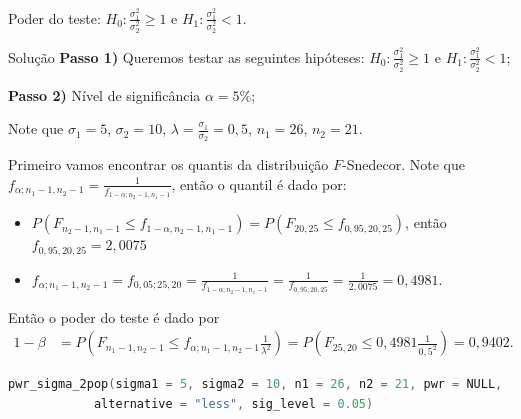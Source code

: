 \documentclass[9pt]{beamer}
\begin{document}
\begin{frame}[fragile]{Poder do teste: $H_0:\frac{\sigma_1^2}{\sigma_2^2} \geq 1$ e $H_1:\frac{\sigma_1^2}{\sigma_2^2} < 1$.}

\small
\begin{block}{Solução}
	\textbf{Passo 1)} Queremos testar as seguintes hipóteses: $H_0: \frac{\sigma_1^2}{\sigma_2^2} \geq 1$ e $H_1: \frac{\sigma_1^2}{\sigma_2^2} < 1$;
	
	\textbf{Passo 2)} Nível de significância $\alpha=5\%$;
	
	Note que $\sigma_1=5$, $\sigma_2=10$, $\lambda =  \frac{\sigma_1}{\sigma_2} = 0,5$, $n_1 = 26$, $n_2 = 21$.
	
	Primeiro vamos encontrar os quantis da distribuição $F$-Snedecor. Note que $f_{\alpha; n_1-1, n_2-1} = \frac{1}{f_{1-\alpha; n_2-1, n_1-1}}$, então o quantil é dado por:
	\begin{itemize}
		\item $P\left(F_{n_2-1, n_1-1} \leq f_{1-\alpha, n_2-1, n_1-1} \right) = P\left(F_{20, 25} \leq f_{0,95, 20, 25} \right)$, então $f_{0,95, 20, 25} = 2,0075$
		\item $f_{\alpha; n_1-1, n_2-1} = f_{0,05; 25, 20} = \frac{1}{f_{1-\alpha; n_2-1, n_1-1}} = \frac{1}{f_{0,95; 20, 25}} = \frac{1}{2,0075}=0,4981$.
	\end{itemize}

	Então o poder do teste é dado por
	\begin{align*}
		1-\beta &= P\left(F_{n_1-1, n_2-1} \leq f_{\alpha;n_1-1, n_2-1}  \frac{1}{\lambda^2}\right) = P\left(F_{25, 20} \leq 0,4981  \frac{1}{0,5^2}\right)=0,9402.
	\end{align*}
\end{block}

\begin{lstlisting}[language = C, caption = Código no R.]
pwr_sigma_2pop(sigma1 = 5, sigma2 = 10, n1 = 26, n2 = 21, pwr = NULL,
			alternative = "less", sig_level = 0.05)
\end{lstlisting}

\normalsize
\end{frame}
\end{document}
